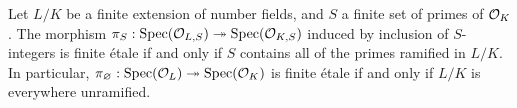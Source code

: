 \begin{thm}
	\label{thm:fet_covers_of_number_rings}
	Let $L/K$ be a finite extension of number fields, and $S$ a finite set of primes of $\mathcal{O}_K$. The morphism $\pi_S : \mathrm{Spec}(\mathcal{O}_{L,S}) \twoheadrightarrow \mathrm{Spec}(\mathcal{O}_{K,S})$ induced by inclusion of $S$-integers is finite \'etale if and only if $S$ contains all of the primes ramified in $L/K$. In particular, $\pi_\varnothing : \mathrm{Spec}(\mathcal{O}_L) \twoheadrightarrow \mathrm{Spec}(\mathcal{O}_K)$ is finite \'etale if and only if $L/K$ is everywhere unramified.
\end{thm}

